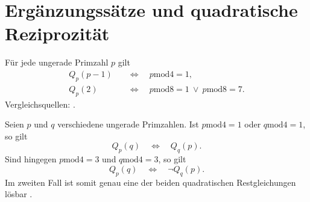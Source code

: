 \section{Ergänzungssätze und quadratische Reziprozität}

\begin{theorem}
\label{b10guide:thm:quadratic-supplementary-laws}
Für jede ungerade Primzahl $p$ gilt
\[
 \begin{aligned}
 Q_p(p-1)&\quad\Longleftrightarrow\quad
               p\mathbin{\mathrm{mod}}4=1,\\
 Q_p(2)&\quad\Longleftrightarrow\quad
               p\mathbin{\mathrm{mod}}8=1
               \ \lor\ p\mathbin{\mathrm{mod}}8=7.
 \end{aligned}
\]
Vergleichsquellen: \cite{natquadraticbasic,natquadraticreciprocity}.
\end{theorem}

\begin{theorem}
\label{b10guide:thm:quadratic-reciprocity}
Seien $p$ und $q$ verschiedene ungerade Primzahlen.
Ist $p\mathbin{\mathrm{mod}}4=1$ oder
$q\mathbin{\mathrm{mod}}4=1$, so gilt
\[
 Q_p(q)\quad\Longleftrightarrow\quad Q_q(p).
\]
Sind hingegen $p\mathbin{\mathrm{mod}}4=3$ und
$q\mathbin{\mathrm{mod}}4=3$, so gilt
\[
 Q_p(q)\quad\Longleftrightarrow\quad \neg Q_q(p).
\]
Im zweiten Fall ist somit genau eine der beiden quadratischen
Restgleichungen lösbar \cite{natquadraticreciprocity}.
\end{theorem}
